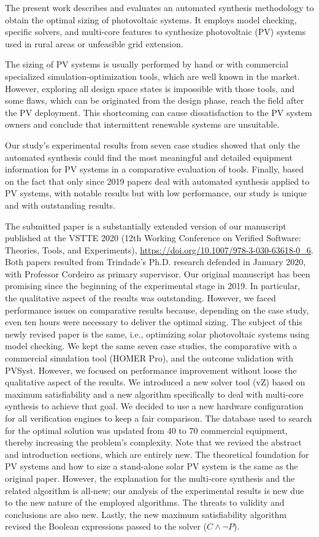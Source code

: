 \documentclass[11pt]{article}
\begin{document}
The present work describes and evaluates an automated synthesis methodology to obtain the optimal sizing of photovoltaic systems. It employs model checking, specific solvers, and multi-core features to synthesize photovoltaic (PV) systems used in rural areas or unfeasible grid extension.

The sizing of PV systems is usually performed by hand or with commercial specialized simulation-optimization tools, which are well known in the market. However, exploring all design space states is impossible with those tools, and some flaws, which can be originated from the design phase, reach the field after the PV deployment. This shortcoming can cause dissatisfaction to the PV system owners and conclude that intermittent renewable systems are unsuitable.
   
Our study's experimental results from seven case studies showed that only the automated synthesis could find the most meaningful and detailed equipment information for PV systems in a comparative evaluation of tools. Finally, based on the fact that only since 2019 papers deal with automated synthesis applied to PV systems, with notable results but with low performance, our study is unique and with outstanding results.

The submitted paper is a substantially extended version of our
manuscript published at the VSTTE 2020 (12th Working Conference on Verified Software: Theories, Tools, and Experiments), \url{https://doi.org/10.1007/978-3-030-63618-0_6}.
Both papers resulted from Trindade's Ph.D. research defended in January 2020, with Professor Cordeiro as primary supervisor.
Our original manuscript has been promising since the beginning of the experimental stage in 2019. In particular, the qualitative aspect of the results was outstanding. However, we faced performance issues on comparative results because, depending on the case study, even ten hours were necessary to deliver the optimal sizing. The subject of this newly revised paper is the same, i.e., optimizing solar photovoltaic systems using model checking. We kept the same seven case studies, the comparative with a commercial simulation tool (HOMER Pro), and the outcome validation with PVSyst. However, we focused on performance improvement without loose the qualitative aspect of the results. We introduced a new solver tool (vZ) based on maximum satisfiability and a new algorithm specifically to deal with multi-core synthesis to achieve that goal. We decided to use a new hardware configuration for all verification engines to keep a fair comparison. The database used to search for the optimal solution was updated from $40$ to $70$ commercial equipment, thereby increasing the problem's complexity. Note that we revised the abstract and introduction sections, which are entirely new. The theoretical foundation for PV systems and how to size a stand-alone solar PV system is the same as the original paper. However, the explanation for the multi-core synthesis and the related algorithm is all-new; our analysis of the experimental results is new due to the new nature of the employed algorithms. The threats to validity and conclusions are also new. 
Lastly, the new maximum satisfiability algorithm revised the Boolean expressions passed to the solver ($C \wedge \neg P$). 
\end{document}
